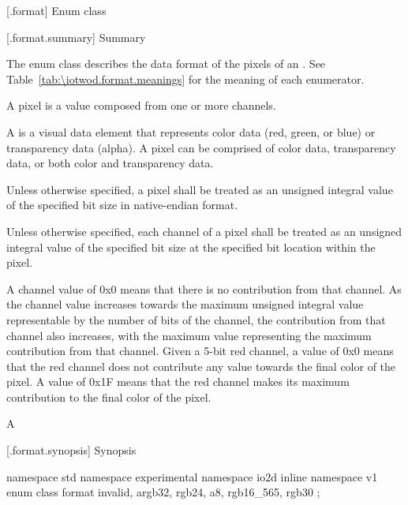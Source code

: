  [\iotwod.format] {Enum class }

 [\iotwod.format.summary] { Summary}

\pnum
The  enum class describes the data format of the pixels of an 
. See Table~\ref{tab:\iotwod.format.meanings} for 
the meaning of each  enumerator.

\pnum
A pixel is a value composed from one or more channels.

\pnum
A  is a visual data element that represents color data (red, green,
or blue) or transparency data (alpha). A pixel can be comprised of color data,
transparency data, or both color and transparency data.

\pnum
Unless otherwise specified, a pixel shall be treated as an unsigned integral
value of the specified bit size in native-endian format.

\pnum
Unless otherwise specified, each channel of a pixel shall be treated as an 
unsigned integral value of the specified bit size at the specified bit location
within the pixel.

\pnum
A channel value of 0x0 means that there is no contribution from that channel. 
As the channel value increases towards the maximum unsigned integral value 
representable by the number of bits of the channel, the contribution from that 
channel also increases, with the maximum value representing the maximum
contribution from that channel.
\enterexample
Given a 5-bit red channel, a value of 0x0 means that the red channel does not 
contribute any value towards the final color of the pixel. A value of 0x1F 
means that the red channel makes its maximum contribution to the final color of 
the pixel.

A
\exitexample

 [\iotwod.format.synopsis] { Synopsis}

\begin{codeblock}
namespace std { namespace experimental { namespace io2d { inline namespace v1 {
  enum class format {
    invalid,
    argb32,
    rgb24,
    a8,
    rgb16_565,
    rgb30
  };
} } } }
\end{codeblock}

